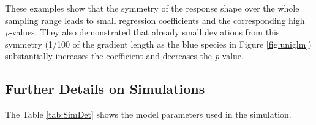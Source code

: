 		These examples show that the symmetry of the response shape over the whole sampling range leads to small regression coefficients and the corresponding high \textit{p}-values. 
		They also demonstrated that already small deviations from this symmetry (1/100 of the gradient length as the blue species in Figure \ref{fig:uniglm}) substantially increases the coefficient and decreases the \textit{p}-value.  
	
		
	
	\subsection{Further Details on Simulations} 
	
		The Table \ref{tab:SimDet} shows the model parameters used in the simulation.
		
